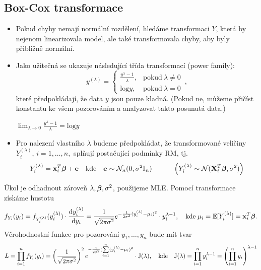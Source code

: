 \subsection{Box-Cox transformace}
\begin{itemize}
\item Pokud chyby nemají normální rozdělení, hledáme transformaci $Y$, která by nejenom linearizovala model, ale také transformovala chyby, aby byly přibližně normální.
\item Jako užitečná se ukazuje následující třída transformací (power family):
$$
 y^{(\lambda)} = \begin{cases}
      \frac{y^{\lambda}-1}{\lambda}, & \text{pokud}\ \lambda \neq 0 \\
      \text{log}y, & \text{pokud}\ \lambda = 0
    \end{cases} \, ,
$$
které předpokládají, že data $ y $ jsou pouze kladná. (Pokud ne, můžeme přičíst konstantu ke všem pozorováním a analyzovat takto posunutá data.)
\begin{remark}
$ \lim_{\lambda \rightarrow 0}  \frac{y^{\lambda}-1}{\lambda} = \text{log}y $
\end{remark}
\item Pro nalezení vlastního $ \lambda $ budeme předpokládat, že transformované veličiny \\ $ Y_i^{(\lambda)}, \, i = 1,\dots,n, $ splňují postačující podmínky RM, tj. 
$$
 Y_i^{(\lambda)} = \textbf{x}_i^T \boldsymbol{\beta} + \textbf{e} \quad \text{kde} \quad \textbf{e} \sim \mathcal{N}_n (0,\sigma^2 \mathbb{I}_{n}) \quad \quad \quad \left( Y_i^{(\lambda)} \sim \mathcal{N} ( \textbf{X}_i^T \boldsymbol{\beta} , \sigma^2 ) \right)
$$
\end{itemize}
Úkol je odhadnout zároveň $ \lambda , \boldsymbol{\beta} , \sigma^2 $, použijeme MLE. Pomocí transformace získáme hustotu
$$
  f_{Y_i}(y_i) = f_{Y_i^{(\lambda)}}(y_i^{(\lambda)}) \cdot \dfrac{\mathrm{d} y_i^{(\lambda)}}{\mathrm{d} y_i} = \dfrac{1}{\sqrt{2 \pi \sigma^2}} e^{-\frac{1}{2 \sigma^2}( y_i^{(\lambda)} - \mu_i)^2} \cdot y_i^{\lambda - 1}, \quad \text{kde} \; \mu_i = \mathbb{E}[Y_i^{(\lambda)}] = \textbf{x}_i^T \boldsymbol{\beta}.
$$
Věrohodnostní funkce pro pozorování $ y_1,\dots,y_n $ bude mít tvar
$$
  L = \prod_{i=1}^{n}f_{Y_i}(y_i) = \left( \frac{1}{\sqrt{2 \pi \sigma^2}} \right)^2 e^{-\frac{1}{2 \sigma^2}(\sum\limits_{i=1}^{n} ( y_i^{(\lambda)} - \mu_i )^2} \cdot \mathrm{J}(\lambda), \quad \text{kde} \quad \mathrm{J}(\lambda) = \prod_{i=1}^{n} y_i^{\lambda - 1} = \left( \prod_{i=1}^{n} y_i \right)^{\lambda - 1}
$$


